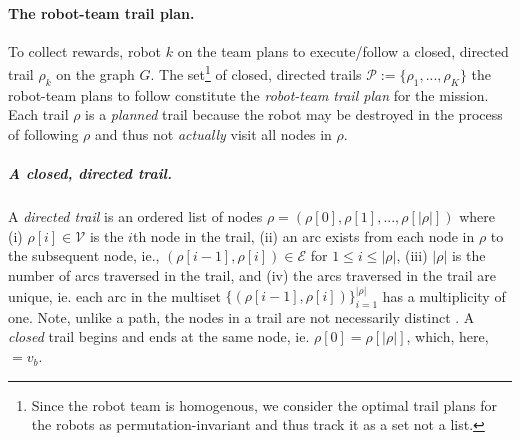 \documentclass[11pt, oneside]{article}
\begin{document}
\paragraph{The robot-team trail plan.}
To collect rewards, robot $k$ on the team plans to execute/follow a closed, directed trail $\rho_k$ on the graph $G$.  
The set\footnote{Since the robot team is homogenous, we consider the optimal trail plans for the robots as permutation-invariant and thus track it as a set not a list.} of closed, directed trails $\mathcal{P}:=\{\rho_1, ..., \rho_K\}$ the robot-team plans to follow constitute the \emph{robot-team trail plan} for the mission. 
Each trail $\rho$ is a \emph{planned} trail because the robot may be destroyed in the process of following $\rho$ and thus not \emph{actually} visit all nodes in $\rho$.

\vspace{-\baselineskip}
\subparagraph{A closed, directed trail.} 
A \emph{directed trail} \cite{clark1991first,graphtheory2} is an ordered list of nodes $\rho = (\rho[0], \rho[1], ..., \rho[\lvert \rho \rvert])$ where
(i) $\rho[i] \in \mathcal{V}$ is the $i$th node in the trail,  
(ii) an arc exists from each node in $\rho$ to the subsequent node, ie., $(\rho[i-1], \rho[i])\in\mathcal{E}$ for $1 \leq i  \leq \lvert \rho \rvert$,
(iii) $\lvert \rho \rvert$ is the number of arcs traversed in the trail,
and
(iv) the arcs traversed in the trail are unique, ie. each arc in the multiset $\{(\rho[i-1], \rho[i])\}_{i=1}^{\lvert \rho \rvert}$ has a multiplicity of one.
Note, unlike a path, the nodes in a trail are not necessarily distinct \cite{wilson1979introduction}.
A \emph{closed} trail begins and ends at the same node, ie. $\rho [0]=\rho[\lvert \rho \rvert]$, which, here, $=v_b$.

\end{document}
